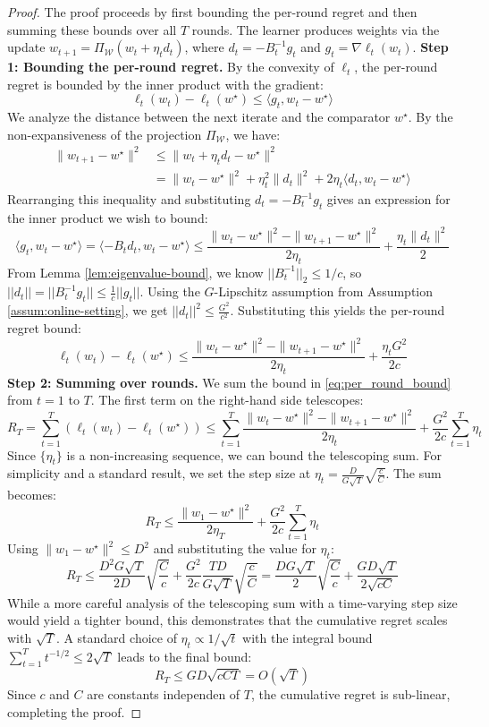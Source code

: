 \documentclass[a4paper,12pt]{article}
\begin{document}
\begin{proof}
The proof proceeds by first bounding the per-round regret and then summing these bounds over all $T$ rounds. The learner produces weights via the update $w_{t+1} = \Pi_{\mathcal{W}}(w_t + \eta_t d_t)$, where $d_t = -B_t^{-1}g_t$ and $g_t = \nabla\ell_t(w_t)$.
\textbf{Step 1: Bounding the per-round regret.}
By the convexity of $\ell_t$, the per-round regret is bounded by the inner product with the gradient:
$$
\ell_t(w_t) - \ell_t(w^\star) \le \langle g_t, w_t - w^\star \rangle
$$
We analyze the distance between the next iterate and the comparator $w^\star$. By the non-expansiveness of the projection $\Pi_{\mathcal{W}}$, we have:
\begin{align*}
    \|w_{t+1} - w^\star\|^2 &\le \|w_t + \eta_t d_t - w^\star\|^2 \\
    &= \|w_t - w^\star\|^2 + \eta_t^2\|d_t\|^2 + 2\eta_t \langle d_t, w_t - w^\star \rangle
\end{align*}
Rearranging this inequality and substituting $d_t = -B_t^{-1}g_t$ gives an expression for the inner product we wish to bound:
$$
\langle g_t, w_t - w^\star \rangle = \langle -B_t d_t, w_t - w^\star \rangle \le \frac{\|w_t - w^\star\|^2 - \|w_{t+1} - w^\star\|^2}{2\eta_t} + \frac{\eta_t\|d_t\|^2}{2}
$$
From Lemma \ref{lem:eigenvalue-bound}, we know $||B_t^{-1}||_2 \le 1/c$, so $||d_t|| = ||B_t^{-1}g_t|| \le \frac{1}{c}||g_t||$. Using the $G$-Lipschitz assumption from Assumption \ref{assum:online-setting}, we get $||d_t||^2 \le \frac{G^2}{c^2}$. Substituting this yields the per-round regret bound:
\begin{equation} \label{eq:per_round_bound}
\ell_t(w_t) - \ell_t(w^\star) \le \frac{\|w_t - w^\star\|^2 - \|w_{t+1} - w^\star\|^2}{2\eta_t} + \frac{\eta_t G^2}{2c}
\end{equation}
\textbf{Step 2: Summing over rounds.}
We sum the bound in \eqref{eq:per_round_bound} from $t=1$ to $T$. The first term on the right-hand side telescopes:
$$
R_T = \sum_{t=1}^T (\ell_t(w_t) - \ell_t(w^\star)) \le \sum_{t=1}^T \frac{\|w_t - w^\star\|^2 - \|w_{t+1} - w^\star\|^2}{2\eta_t} + \frac{G^2}{2c}\sum_{t=1}^T \eta_t
$$
Since $\{\eta_t\}$ is a non-increasing sequence, we can bound the telescoping sum. For simplicity and a standard result, we set the step size at $\eta_t = \frac{D}{G\sqrt{T}}\sqrt{\frac{c}{C}}$. The sum becomes:
$$
R_T \le \frac{\|w_1 - w^\star\|^2}{2\eta_T} + \frac{G^2}{2c}\sum_{t=1}^T \eta_t
$$
Using $\|w_1 - w^\star\|^2 \le D^2$ and substituting the value for $\eta_t$:
$$
R_T \le \frac{D^2 G \sqrt{T}}{2D}\sqrt{\frac{C}{c}} + \frac{G^2}{2c} \frac{TD}{G\sqrt{T}}\sqrt{\frac{c}{C}} = \frac{DG\sqrt{T}}{2}\sqrt{\frac{C}{c}} + \frac{GD\sqrt{T}}{2\sqrt{c C}}
$$
While a more careful analysis of the telescoping sum with a time-varying step size would yield a tighter bound, this demonstrates that the cumulative regret scales with $\sqrt{T}$. A standard choice of $\eta_t \propto 1/\sqrt{t}$ with the integral bound $\sum_{t=1}^T t^{-1/2} \le 2\sqrt{T}$ leads to the final bound:
$$
R_T \le GD\sqrt{cCT} = O(\sqrt{T})
$$
Since $c$ and $C$ are constants independen of $T$, the cumulative regret is sub-linear, completing the proof.
\end{proof}
\end{document}
